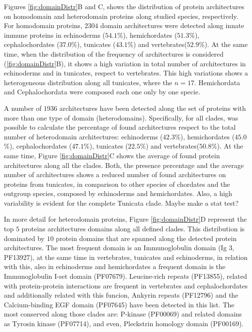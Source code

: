\documentclass[11pt]{article}
\newcommand{\TODO}[1]{\begingroup\color{red}#1\endgroup}
\begin{document}
Figures \ref{fig:domainDistr}B and C, shows the distribution of protein 
architectures on homodomain and heterodomain proteins along studied species, 
respectively. For homodomain proteins, $2304$ domain architectures were 
detected along innate immune proteins in echinoderms ($54.1$\%), hemichordates 
($51.3$\%), cephalochordates ($37.0$\%), tunicates ($43.1$\%) and 
vertebrates($52.9$\%). At the same time, when the distribution of the frequency 
of architectures is considered (\ref{fig:domainDistr}B), it shows a 
high variation in total number of architectures in echinoderms and in 
tunicates, respect to vertebrates. \TODO{This high variations shows a 
heterogeneous distribution along all tunicates, where the $n = 17$}. 
Hemichordata and Cephalochordata were composed each one only by one specie.  

A number of $1936$ architectures have been detected along the set of proteins 
with more than one type of domain (heterodomains). Specifically, for all 
clades, was possible to calculate the percentage of found architectures 
respect to the total number of heterodomain architectures: echinoderms 
($42.3$\%), hemichordates ($45.0$\%), cephalochordates ($47.1$\%), tunicates 
($22.5$\%) and vertebrates($50.8$\%). At the same time, Figure 
\ref{fig:domainDistr}C shows the average of found protein architectures along 
all the clades. Both, the presence percentage and the average number 
of architectures shows a reduced number of found architectures on proteins from 
tunicates, in comparison to other species of chordates and the outgroup 
species, composed by echinoderms and hemichordates. Also, a high variability is 
evident for the complete Tunicata clade. \TODO{Maybe make a stat test?}  

In more detail for heterodomain proteins, Figure \ref{fig:domainDistr}D 
represent the top $5$ proteins architectures domains along all defined clades. 
This distribution is dominated by $10$ protein domains that are spanned along 
the detected protein architectures. The most frequent domain is an 
Immunoglobulin domain (Ig 3, PF13927), at the same time in vertebrates, 
tunicates and echinoderms, in relation with this, also in echinoderms
and hemichordates a frequent domain is the Immunoglobulin I-set domain 
(PF07679). Leucine-rich repeats (PF13855), related with protein-protein 
interactions are frequent in vertebrates and cephalochordates and additionally 
related with this funcion, Ankyrin repeats (PF12796) and the Calcium-binding 
EGF domain (PF07645) have been detected in this list. The most conserved along 
those clades are: P-kinase (PF00069) and related domains as Tyrosin kinase 
(PF07714), and even, Pleckstrin homology domain (PF00169).
\end{document}
